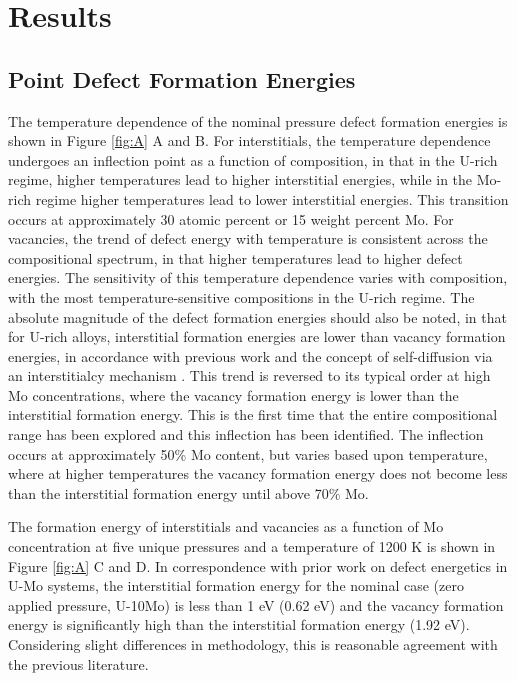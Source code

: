 \documentclass[11pt, oneside]{elsarticle}
\begin{document}
\section{Results}\label{sec3}
\subsection{Point Defect Formation Energies}
The temperature dependence of the nominal pressure defect formation energies is shown in Figure \ref{fig:A} A and B. For interstitials, the temperature dependence undergoes an inflection point as a function of composition, in that in the U-rich regime, higher temperatures lead to higher interstitial energies, while in the Mo-rich regime higher temperatures lead to lower interstitial energies. This transition occurs at approximately 30 atomic percent or 15 weight percent Mo. For vacancies, the trend of defect energy with temperature is consistent across the compositional spectrum, in that higher temperatures lead to higher defect energies. The sensitivity of this temperature dependence varies with composition, with the most temperature-sensitive compositions in the U-rich regime. The absolute magnitude of the defect formation energies should also be noted, in that for U-rich alloys, interstitial formation energies are lower than vacancy formation energies, in accordance with previous work \cite{beeler2010,beelerAIMD,smirnova2015,park2021} and the concept of self-diffusion via an interstitialcy mechanism \cite{park2021}. This trend is reversed to its typical order at high Mo concentrations, where the vacancy formation energy is lower than the interstitial formation energy. This is the first time that the entire compositional range has been explored and this inflection has been identified. The inflection occurs at approximately 50\% Mo content, but varies based upon temperature, where at higher temperatures the vacancy formation energy does not become less than the interstitial formation energy until above 70\% Mo. 

The formation energy of interstitials and vacancies as a function of Mo concentration at five unique pressures and a temperature of 1200 K is shown in Figure \ref{fig:A} C and D. In correspondence with prior work \cite{park2021} on defect energetics in U-Mo systems, the interstitial formation energy for the nominal case (zero applied pressure, U-10Mo) is less than 1 eV (0.62 eV) and the vacancy formation energy is significantly high than the interstitial formation energy (1.92 eV). Considering slight differences in methodology, this is reasonable agreement with the previous literature. 
\end{document}
